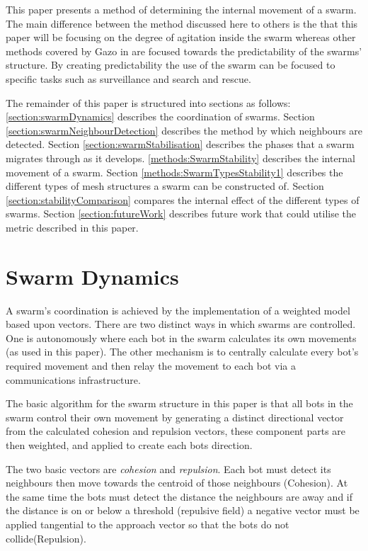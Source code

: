 \documentclass[10pt,journal,letterpaper,twoside]{IEEEtran}
\newcommand{\stability}{internal movement}
\begin{document}
This paper presents a method of determining the \stability{} of a
swarm. The main difference between the method discussed here to others
\cite{VGKP02} \cite{XCFPLLHF06} is the that this paper will be
focusing on the degree of agitation inside the swarm whereas other
methods covered by Gazo in \cite{VGKP11} are focused towards the
predictability of the swarms' structure. By creating predictability
the use of the swarm can be focused to specific tasks such as
surveillance and search and rescue.

The remainder of this paper is structured into sections as follows:
\ref{section:swarmDynamics} describes the coordination of
swarms. Section \ref{section:swarmNeighbourDetection} describes the
method by which neighbours are detected. Section
\ref{section:swarmStabilisation} describes the phases that a swarm
migrates through as it develops. \ref{methods:SwarmStability}
describes the internal movement of a swarm. Section
\ref{methods:SwarmTypesStability1} describes the different types of
mesh structures a swarm can be constructed of. Section
\ref{section:stabilityComparison} compares the internal effect of the
different types of swarms. Section \ref{section:futureWork} describes
future work that could utilise the metric described in this paper.

\section{Swarm Dynamics\label{section:swarmDynamics}}

A swarm's coordination is achieved by the implementation of a weighted
model based upon vectors. There are two distinct ways in which swarms
are controlled. One is autonomously where each bot in the swarm
calculates its own movements (as used in this paper). The other
mechanism is to centrally calculate every bot's required movement and
then relay the movement to each bot via a communications
infrastructure.

The basic algorithm for the swarm structure in this paper is that all
bots in the swarm control their own movement by generating a distinct
directional vector from the calculated cohesion and repulsion vectors,
these component parts are then weighted, and applied to create each
bots direction.

The two basic vectors are \emph{cohesion} and \emph{repulsion}. Each
bot must detect its neighbours then move towards the centroid of those
neighbours (Cohesion). At the same time the bots must detect the
distance the neighbours are away and if the distance is on or below a
threshold (repulsive field) a negative vector must be applied
tangential to the approach vector so that the bots do not
collide(Repulsion).
\end{document}
